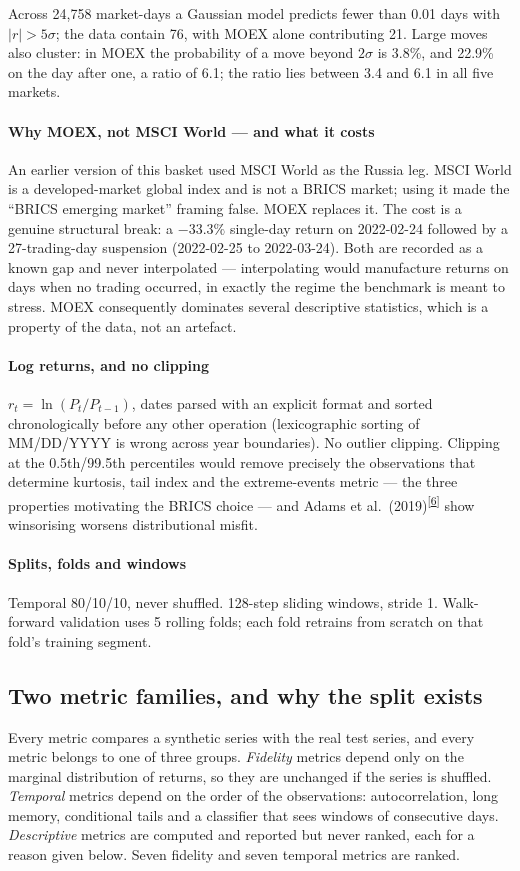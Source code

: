 \documentclass[11pt,a4paper]{article}
\makeatletter
\newcommand{\tcite}[1]{\textsuperscript{[\hyperlink{R:#1}{#1}]}}
\DeclareRobustCommand{\_}{\ifmmode\nfss@text{\textunderscore}\else\textunderscore\allowbreak\fi}
\makeatother
\begin{document}
Across 24,758 market-days a Gaussian model predicts fewer than 0.01 days with $|r|>5\sigma$; the data contain 76, with MOEX alone contributing 21. Large moves also cluster: in MOEX the probability of a move beyond $2\sigma$ is 3.8\%, and 22.9\% on the day after one, a ratio of 6.1; the ratio lies between 3.4 and 6.1 in all five markets.

\paragraph{Why MOEX, not MSCI World --- and what it costs} An earlier version of this basket used MSCI World as the Russia leg. MSCI World is a developed-market global index and is not a BRICS market; using it made the ``BRICS emerging market'' framing false. MOEX replaces it. The cost is a genuine structural break: a $-33.3\%$ single-day return on 2022-02-24 followed by a 27-trading-day suspension (2022-02-25 to 2022-03-24). Both are recorded as a known gap and never interpolated --- interpolating would manufacture returns on days when no trading occurred, in exactly the regime the benchmark is meant to stress. MOEX consequently dominates several descriptive statistics, which is a property of the data, not an artefact.

\paragraph{Log returns, and no clipping} $r_t = \ln(P_t/P_{t-1})$, dates parsed with an explicit format and sorted chronologically before any other operation (lexicographic sorting of MM/DD/YYYY is wrong across year boundaries). No outlier clipping. Clipping at the 0.5th/99.5th percentiles would remove precisely the observations that determine kurtosis, tail index and the extreme-events metric --- the three properties motivating the BRICS choice --- and Adams et al.\ (2019)\tcite{6} show winsorising worsens distributional misfit.

\paragraph{Splits, folds and windows} Temporal 80/10/10, never shuffled. 128-step sliding windows, stride 1. Walk-forward validation uses 5 rolling folds; each fold retrains from scratch on that fold's training segment.

\subsection{Two metric families, and why the split exists}
\label{sec:families}
Every metric compares a synthetic series with the real test series, and every metric belongs to one of three groups. \emph{Fidelity} metrics depend only on the marginal distribution of returns, so they are unchanged if the series is shuffled. \emph{Temporal} metrics depend on the order of the observations: autocorrelation, long memory, conditional tails and a classifier that sees windows of consecutive days. \emph{Descriptive} metrics are computed and reported but never ranked, each for a reason given below. Seven fidelity and seven temporal metrics are ranked.
\end{document}
